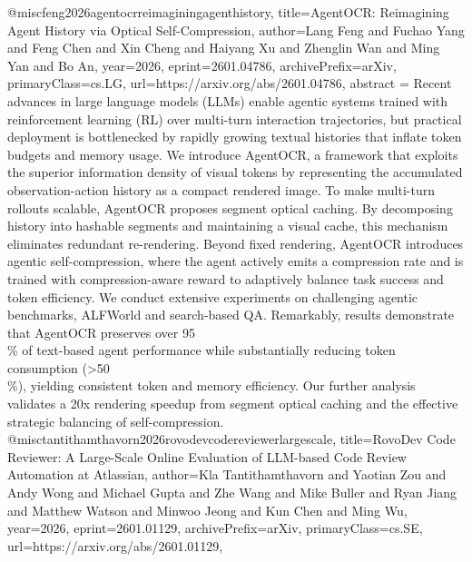 {}@misc{feng2026agentocrreimaginingagenthistory,
      title={AgentOCR: Reimagining Agent History via Optical Self-Compression}, 
      author={Lang Feng and Fuchao Yang and Feng Chen and Xin Cheng and Haiyang Xu and Zhenglin Wan and Ming Yan and Bo An},
      year={2026},
      eprint={2601.04786},
      archivePrefix={arXiv},
      primaryClass={cs.LG},
      url={https://arxiv.org/abs/2601.04786},
      abstract = {Recent advances in large language models (LLMs) enable agentic systems trained with reinforcement learning (RL) over multi-turn interaction trajectories, but practical deployment is bottlenecked by rapidly growing textual histories that inflate token budgets and memory usage. We introduce AgentOCR, a framework that exploits the superior information density of visual tokens by representing the accumulated observation-action history as a compact rendered image. To make multi-turn rollouts scalable, AgentOCR proposes segment optical caching. By decomposing history into hashable segments and maintaining a visual cache, this mechanism eliminates redundant re-rendering. Beyond fixed rendering, AgentOCR introduces agentic self-compression, where the agent actively emits a compression rate and is trained with compression-aware reward to adaptively balance task success and token efficiency. We conduct extensive experiments on challenging agentic benchmarks, ALFWorld and search-based QA. Remarkably, results demonstrate that AgentOCR preserves over 95\\\% of text-based agent performance while substantially reducing token consumption (>50\\\%), yielding consistent token and memory efficiency. Our further analysis validates a 20x rendering speedup from segment optical caching and the effective strategic balancing of self-compression.}
}@misc{tantithamthavorn2026rovodevcodereviewerlargescale,
      title={RovoDev Code Reviewer: A Large-Scale Online Evaluation of LLM-based Code Review Automation at Atlassian}, 
      author={Kla Tantithamthavorn and Yaotian Zou and Andy Wong and Michael Gupta and Zhe Wang and Mike Buller and Ryan Jiang and Matthew Watson and Minwoo Jeong and Kun Chen and Ming Wu},
      year={2026},
      eprint={2601.01129},
      archivePrefix={arXiv},
      primaryClass={cs.SE},
      url={https://arxiv.org/abs/2601.01129},
}
